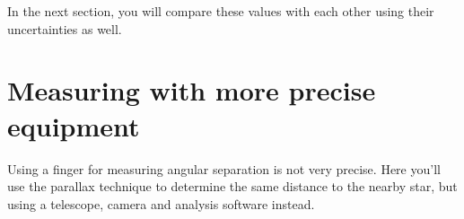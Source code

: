 In the next section, you will compare these values with each other using their uncertainties as well.


\section{Measuring with more precise equipment}

Using a finger for measuring angular separation is not very precise. Here you'll use the parallax technique to determine the same distance to the nearby star, but using a telescope, camera and analysis software instead.


